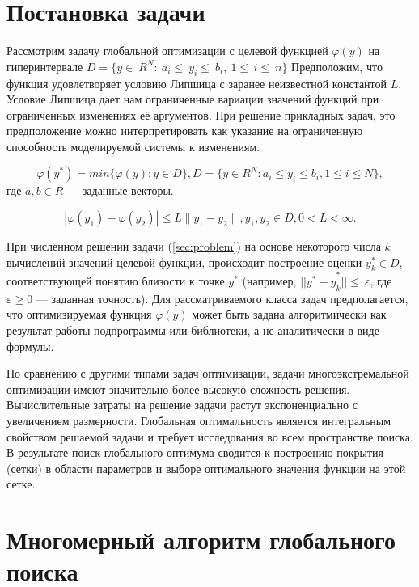 \documentclass[12pt, a4paper, russian]{article}
\begin{document}
\section{Постановка задачи}

Рассмотрим задачу глобальной оптимизации с целевой функцией $\varphi(y)$ на гиперинтервале $D=\{ y\in\ R^N:\ a_i\le\ y_i\le\ b_i,\ 1 \le\, i\le\ n \}$ Предположим, что функция удовлетворяет условию Липшица с заранее неизвестной константой $L$. Условие Липшица дает нам  ограниченные вариации значений функций при ограниченных изменениях её аргументов. При решение прикладных задач, это предположение можно интерпретировать как указание на ограниченную способность моделируемой системы к изменениям. 




\begin{equation} \label{sec:problem}   
\varphi(y^*) = min\{\varphi(y):y\in D\}, D = \{y \in R^N : a_i \leq y_i \leq b_i, 1 \leq i \leq N \},
\end{equation}
где $a,b \in R$ --- заданные векторы.


\begin{displaymath}
|\varphi(y_1)-\varphi(y_2)|\leq L\parallel y_1-y_2 \parallel
,y_1,y_2 \in D, 0<L< \infty.
\end{displaymath}




При численном решении задачи (\ref{sec:problem}) на основе некоторого числа $k$ вычислений значений целевой функции, происходит построение оценки $y_k^\ast\in D$,  соответствующей понятию близости к точке $y^\ast$ (например, ${ ||y^\ast -y}_k^\ast||\le\ \varepsilon$, где $\varepsilon\geq0$ — заданная точность). Для рассматриваемого класса задач предполагается, что оптимизируемая функция $\varphi(y)$ может быть задана алгоритмически как результат работы подпрограммы или библиотеки, а не аналитически в виде формулы.

По сравнению с другими типами задач оптимизации, задачи многоэкстремальной оптимизации имеют значительно более высокую сложность решения. Вычислительные затраты на решение задачи растут экспоненциально с увеличением размерности. Глобальная оптимальность является интегральным свойством решаемой задачи и требует исследования во всем пространстве поиска. В результате поиск глобального оптимума сводится к построению покрытия (сетки) в области параметров и выборе оптимального значения функции на этой сетке. 


\section{Многомерный алгоритм глобального поиска}
\end{document}
